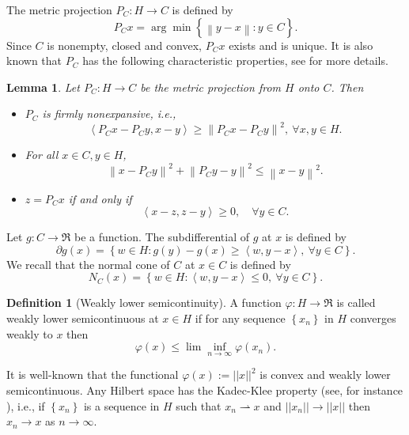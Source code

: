 \documentclass{aims}
\newtheorem{lemma}[theorem]{Lemma}
\theoremstyle{definition}
\newtheorem{definition}[theorem]{Definition}
\begin{document}
The metric projection $P_C:H\to C$ is defined by
\begin{equation*}\label{eq:1.3}
P_C x=\arg\min\left\{\left\|y-x\right\|:y\in C\right\}.
\end{equation*}
Since $C$ is nonempty, closed and convex, $P_Cx$ exists and is unique. It is also known that $P_C$ has the following characteristic properties, 
see \cite{GR1984} for more details.
\begin{lemma}\label{lem.PropertyPC}
Let $P_C:H\to C$ be the metric projection from $H$ onto $C$. Then
\begin{itemize}
\item [$(i)$] $P_C$ is firmly nonexpansive, i.e.,
\begin{equation*}\label{eq:FirmlyNonexpOfPC}
\left\langle P_C x-P_C y,x-y \right\rangle \ge \left\|P_C x-P_C y\right\|^2,~\forall x,y\in H.
\end{equation*}
\item [$(ii)$] For all $x\in C, y\in H$,
\begin{equation}\label{eq:ProperOfPC}
\left\|x-P_C y\right\|^2+\left\|P_C y-y\right\|^2\le \left\|x-y\right\|^2.
\end{equation}
\item [$(iii)$] $z=P_C x$ if and only if 
\begin{equation}\label{eq:EquivalentPC}
\left\langle x-z,z-y \right\rangle \ge 0,\quad \forall y\in C.
\end{equation}
\end{itemize}
\end{lemma}
Let $g:C\to \Re$ be a function. The subdifferential of $g$ at $x$ is defined by
\begin{equation*}\label{eq:Subdifferential}
\partial g(x)=\left\{ w\in H: g(y)-g(x)\ge \left\langle w, y-x\right\rangle,~\forall y\in C\right\}.
\end{equation*}
We recall that the normal cone of $C$ at $x\in C$ is defined by
\begin{equation*}\label{eq:NormalCone}
N_C(x)=\left\{w\in H:\left\langle w,y-x  \right\rangle \le 0,~\forall y\in C\right\}.
\end{equation*}
\begin{definition}[Weakly lower semicontinuity]
A function $\varphi: H\to \Re$ is called weakly lower semicontinuous at $x\in H$ if for any sequence $\left\{x_n\right\}$ in $H$ converges weakly to $x$ then 
$$\varphi(x)\le \lim\inf_{n\to\infty}\varphi(x_n). $$
\end{definition}
It is well-known that the functional $\varphi(x):=||x||^2$ is convex and weakly lower semicontinuous. Any Hilbert space has the Kadec-Klee property (see, 
for instance \cite{GK1990}), i.e., if $\left\{x_n\right\}$ is a sequence in $H$ such that $x_n\rightharpoonup x$ 
and $||x_n||\to ||x||$ then $x_n\to x$ as $n\to\infty$.
\end{document}
